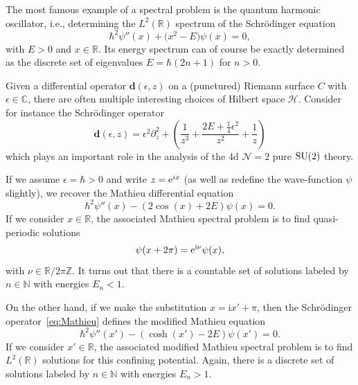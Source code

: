 \documentclass[pdftex]{sigma}
\numberwithin{equation}{section}
\begin{document}
The most famous example of a spectral problem is the quantum harmonic oscillator, i.e., determining the $L^2(\mathbb{R})$ spectrum of the Schr\"odinger equation
\begin{equation*}
 \hbar^2 \psi''(x) + \big(x^2 - E \big) \psi(x) = 0,
\end{equation*}
with $E>0$ and $x \in \mathbb{R}$. Its energy spectrum can of course be exactly determined as the discrete set of eigenvalues $E = \hbar \left( 2 n + 1 \right)$ for $n>0$.

Given a differential operator $\mathbf{d}(\epsilon,z)$ on a (punctured) Riemann surface $C$ with $\epsilon \in \mathbb{C}$, there are often multiple interesting choices of Hilbert space $\mathcal{H}$. Consider for instance the Schr\"odinger operator
\begin{equation}\label{eq:Mathieu}
 \mathbf{d}(\epsilon,z) = \epsilon^2 \partial_z^2 + \left( \frac{1}{z^3} + \frac{2E+\frac{1}{4} \epsilon^2} {z^2} + \frac{1}{z} \right)
\end{equation}
which plays an important role in the analysis of the 4d $\mathcal{N}=2$ pure ${\rm SU}(2)$ theory.

If we assume $\epsilon = \hbar >0$ and write $z={\rm e}^{i x}$ (as well as redefine the wave-function $\psi$ slightly), we recover the Mathieu differential equation
\begin{equation*}
 \hbar^2 \psi''(x) - \left( 2 \cos(x) + 2 E \right) \psi(x)=0.
\end{equation*}
If we consider $x \in \mathbb{R}$, the associated Mathieu spectral problem is to find quasi-periodic solutions
\begin{equation*}
 \psi(x + 2 \pi) = {\rm e}^{{\rm i} \nu} \psi(x),
\end{equation*}
with $\nu \in \mathbb{R}/2 \pi \mathbb{Z}$. It turns out that there is a countable set of solutions labeled by $n \in \mathbb{N}$ with energies $E_n < 1$.

On the other hand, if we make the substitution $x = \mathrm{i} x'+ \pi$, then the Schr\"odinger operator~\eqref{eq:Mathieu} defines the modified Mathieu equation
\begin{equation*}
 \hbar^2 \psi''(x') - \left( \cosh(x') - 2 E \right) \psi(x')=0.
\end{equation*}
If we consider $x' \in \mathbb{R}$, the associated modified Mathieu spectral problem is to find $L^2(\mathbb{R})$ solutions for this confining potential. Again, there is a discrete set of solutions labeled by $n \in \mathbb{N}$ with energies $E_n > 1$.
\end{document}

